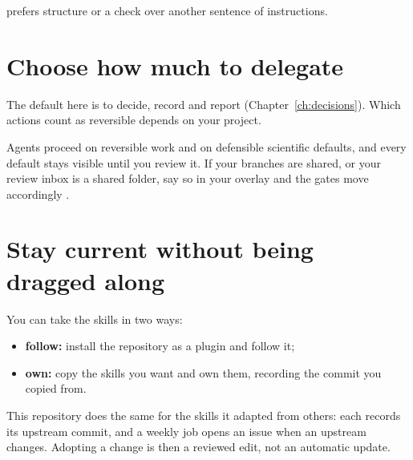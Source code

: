  prefers structure or a check over another sentence of instructions.

\section{Choose how much to delegate}

\begin{headline}
  The default here is to decide, record and report (Chapter~\ref{ch:decisions}). Which
  actions count as reversible depends on your project.
\end{headline}

Agents proceed on reversible work and on defensible scientific defaults, and every
default stays visible until you review it. If your branches are shared, or your review
inbox is a shared folder, say so in your overlay and the gates move accordingly
\cite[Decide, record, report]{skill:actions}.

\section{Stay current without being dragged along}

You can take the skills in two ways:
\begin{itemize}
  \item \textbf{follow:} install the repository as a plugin and follow it;
  \item \textbf{own:} copy the skills you want and own them, recording the commit you copied
        from.
\end{itemize}
This repository does the same for the skills it adapted from others: each records its
upstream commit, and a weekly job opens an issue when an upstream changes. Adopting a
change is then a reviewed edit, not an automatic update.
